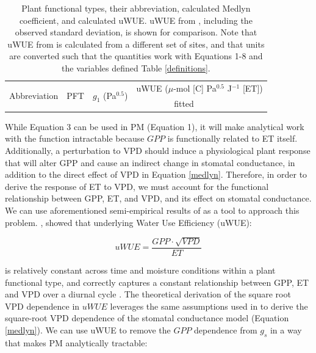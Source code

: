 \documentclass[draft,linenumbers]{afmjournal}
\begin{document}
\begin{table}
  \caption{Plant functional types, their abbreviation, calculated
    Medlyn coefficient, and calculated uWUE. uWUE from
    \citet{Zhou_2015}, including the observed standard deviation, is
    shown for comparison. Note that uWUE from \citet{Zhou_2015} is
    calculated from a different set of sites, and that units are
    converted such that the quantities work with Equations 1-8 and the
    variables defined Table \ref{definitions}.}
  \small
  \label{pft}
  \centering
  \begin{tabular}{l c c @{\qquad} c c}
    \hline
    \multirow{2}[3]{*}{Abbreviation} & \multirow{2}[3]{*}{PFT} & \multirow{2}[3]{*}{$g_1$ (Pa$^{0.5}$)} & \multicolumn{2}{c}{uWUE ($\mu$-mol [C] Pa$^{0.5}$ J$^{-1}$ [ET])}  \\
    \cmidrule{4-5}

                                     & & & fitted & \citet{Zhou_2015} \\

    \hline
    
    \hline
  \end{tabular}
\end{table}

While Equation 3 can be used in PM (Equation 1), it will make
analytical work with the function intractable because $GPP$ is
functionally related to ET itself. Additionally, a perturbation to VPD
should induce a physiological plant response that will alter GPP and
cause an indirect change in stomatal conductance, in addition to the
direct effect of VPD in Equation \ref{medlyn}. Therefore, in order to
derive the response of ET to VPD, we must account for the functional
relationship between GPP, ET, and VPD, and its effect on stomatal
conductance. We can use aforementioned semi-empirical results of
\citet{Zhou_2015} as a tool to approach this
problem. \citet{Zhou_2015}, showed that  underlying Water Use
Efficiency (uWUE):

\begin{linenomath*}
  \begin{equation}
    uWUE = \frac{GPP \cdot \sqrt{VPD}}{ET}
    \label{uwue}
  \end{equation}
\end{linenomath*}

is relatively constant across time and moisture conditions within a
plant functional type, and correctly captures a constant relationship
between GPP, ET and VPD over a diurnal cycle \citep{Zhou_2014}. The
theoretical derivation of the square root VPD dependence in $uWUE$
leverages the same assumptions used in \cite{MEDLYN_2011} to derive the
square-root VPD dependence of the stomatal conductance model (Equation
\ref{medlyn}).  We can use uWUE to remove the $GPP$ dependence from
$g_s$ in a way that makes PM analytically tractable:
\end{document}
